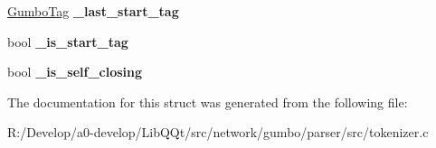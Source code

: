 \begin{DoxyCompactItemize}
\item 
\mbox{\label{struct_gumbo_internal_tag_state_acb113ce80d2c9bf62b72420f25644d02}} 
\mbox{\hyperlink{gumbo_8h_a5a3aa6f4b039f85875d638088e676a0f}{Gumbo\+Tag}} {\bfseries \+\_\+last\+\_\+start\+\_\+tag}
\item 
\mbox{\label{struct_gumbo_internal_tag_state_a72a1c164d65e1821e01901d8de804b64}} 
bool {\bfseries \+\_\+is\+\_\+start\+\_\+tag}
\item 
\mbox{\label{struct_gumbo_internal_tag_state_abefcf0ccafc4655d5c1b16addd4f8c82}} 
bool {\bfseries \+\_\+is\+\_\+self\+\_\+closing}
\end{DoxyCompactItemize}


The documentation for this struct was generated from the following file\+:\begin{DoxyCompactItemize}
\item 
R\+:/\+Develop/a0-\/develop/\+Lib\+Q\+Qt/src/network/gumbo/parser/src/tokenizer.\+c\end{DoxyCompactItemize}
